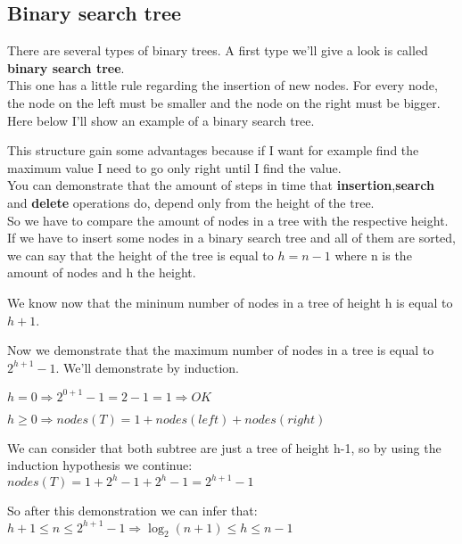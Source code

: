 \documentclass{article}
\begin{document}
\subsection{Binary search tree}
There are several types of binary trees. A first type we'll give a look is called \textbf{binary search tree}.\\
This one has a little rule regarding the insertion of new nodes. For every node, the node on the left must be smaller and the node on the right must be bigger. Here below I'll show an example of a binary search tree.


This structure gain some advantages because if I want for example find the maximum value I need to go only right until I find the value.\\
You can demonstrate that the amount of steps in time that \textbf{insertion},\textbf{search} and \textbf{delete} operations do, depend only from the height of the tree.\\
So we have to compare the amount of nodes in a tree with the respective height.\\
If we have to insert some nodes in a binary search tree and all of them are sorted, we can say that the height of the tree is equal to $h=n-1$ where n is the amount of nodes and h the height.


We know now that the mininum number of nodes in a tree of height h is equal to $h+1$.\\
\begin{large}
Now we demonstrate that the maximum number of nodes in a tree is equal to $2^{h+1} -1$. We'll demonstrate by induction.\\
\begin{center}
$h = 0 \Rightarrow 2^{0+1} -1 = 2-1 = 1 \Rightarrow OK$

$ h \geq 0 \Rightarrow nodes(T) = 1 + nodes(left) + nodes(right)$ 

We can consider that both subtree are just a tree of height h-1, so by using the induction hypothesis we continue:\\

$nodes(T) = 1 + 2^h -1 + 2^h - 1 = 2^{h+1} - 1$

So after this demonstration we can infer that:\\ 
$h+1 \leq n \leq 2^{h+1} - 1 \Rightarrow \log_2(n+1) \leq h \leq n-1 $
\end{center}
\end{large}
\end{document}

